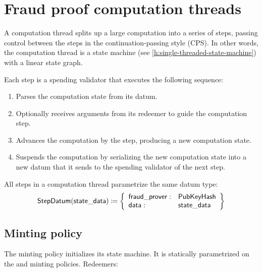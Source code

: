\documentclass[../midgard.tex]{subfiles}
\begin{document}
\section{Fraud proof computation threads}
\label{h:fraud-proof-computation-threads}

A computation thread splits up a large computation into a series of steps, passing control between the steps in the continuation-passing style (CPS).
In other words, the computation thread is a state machine (see \cref{h:single-threaded-state-machine}) with a linear state graph.

Each step is a spending validator that executes the following sequence:
\begin{enumerate}
    \item Parses the computation state from its datum.
    \item Optionally receives arguments from its redeemer to guide the computation step.
    \item Advances the computation by the step, producing a new computation state.
    \item Suspends the computation by serializing the new computation state into a new datum that it sends to the spending validator of the next step.
\end{enumerate}

All steps in a computation thread parametrize the same datum type:
\begin{equation*}
    \mathsf{StepDatum} (\mathsf{state\_data}) \coloneq \left\{
    \begin{array}{ll}
        \mathsf{fraud\_prover}  : & \mathsf{PubKeyHash} \\
        \mathsf{data} : & \mathsf{state\_data}
    \end{array} \right\}
\end{equation*}

\subsection{Minting policy}
\label{h:fraud-proof-computation-threads-minting-policy}

The  minting policy initializes its state machine.
It is statically parametrized on the  and  minting policies.
Redeemers:
\end{document}
